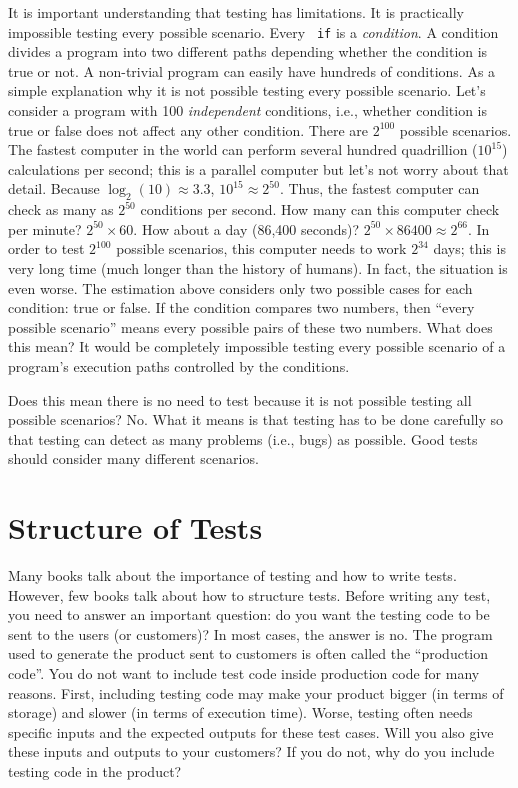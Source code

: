 It is important understanding that testing has limitations.  It is
practically impossible testing every possible scenario.  Every {\tt
  if} is a {\it condition}. A condition divides a program into two
different paths depending whether the condition is true or not.  A
non-trivial program can easily have hundreds of conditions.  As a
simple explanation why it is not possible testing every possible
scenario. Let's consider a program with 100 {\it independent}
conditions, i.e., whether condition is true or false does not affect
any other condition.  There are $2^{100}$ possible scenarios.  The
fastest computer in the world can perform several hundred quadrillion
($10^{15}$) calculations per second; this is a parallel computer but
let's not worry about that detail.  Because $\log_2(10) \approx 3.3$,
$10^{15} \approx 2 ^ {50}$. Thus, the fastest computer can check as
many as $2 ^ {50}$ conditions per second. How many can this computer
check per minute? $2 ^ {50} \times 60$. How about a day (86,400
seconds)?  $2 ^ {50} \times 86400 \approx 2 ^ {66}$.  In order to test
$2^{100}$ possible scenarios, this computer needs to work $2^{34}$
days; this is very long time (much longer than the history of humans).
In fact, the situation is even worse.  The estimation above considers
only two possible cases for each condition: true or false. If the
condition compares two numbers, then ``every possible scenario'' means
every possible pairs of these two numbers.  What does this mean? It
would be completely impossible testing every possible scenario of a
program's execution paths controlled by the conditions.

Does this mean there is no need to test because it is not possible
testing all possible scenarios? No. What it means is that testing has to
be done carefully so that testing can detect as many problems (i.e.,
bugs) as possible.  Good tests should consider many different scenarios.

\section{Structure of Tests}

Many books talk about the importance of testing and how to write
tests.  However, few books talk about how to structure tests. Before
writing any test, you need to answer an important question: do you
want the testing code to be sent to the users (or customers)? In most
cases, the answer is no.  The program used to generate the product
sent to customers is often called the ``production code''.  You do not
want to include test code inside production code for many reasons.
First, including testing code may make your product bigger (in terms
of storage) and slower (in terms of execution time). Worse, testing
often needs specific inputs and the expected outputs for these test
cases.  Will you also give these inputs and outputs to your customers?
If you do not, why do you include testing code in the product?

